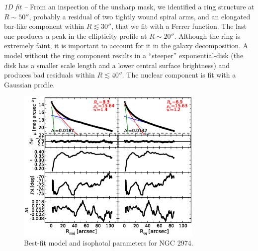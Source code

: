 \documentclass[preprint2]{emulateapj}
\newcommand{\fitfigurewidth}{0.8\textwidth}
\begin{document}

  \emph{1D fit -- }
  From an inspection of the unsharp mask, we identified a ring structure at $R \sim 50''$, 
  probably a residual of two tightly wound spiral arms,
  and an elongated bar-like component within $R \lesssim 30''$, that we fit with a Ferrer function.
  The last one produces a peak in the ellipticity profile at $R \sim 20''$.
  Although the ring is extremely faint, it is important to account for it in the galaxy decomposition. 
  A model without the ring component results in a ``steeper'' exponential-disk (the disk has a smaller scale length 
  and a lower central surface brightness) and produces bad residuals within $R \lesssim 40''$.
  The nuclear component is fit with a Gaussian profile.

  \begin{figure}[h]
  \begin{center}
  \includegraphics[width=\fitfigurewidth]{images/n2974_1Dfit.eps}
  \caption{Best-fit model and isophotal parameters for NGC 2974.}
  \end{center}
  \end{figure}
\end{document}
